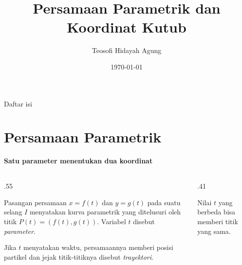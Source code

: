 \documentclass{../../kalkulus-ppt}
\author[Tetew]{Teosofi Hidayah Agung}
\date{\today}
\title[Kalkulus 2 - Bab 5]{Persamaan Parametrik dan Koordinat Kutub}
\institute[Matematika ITS]{Departemen Matematika\\ Institut Teknologi Sepuluh Nopember}
\newcommand{\sumbubidang}[4]{%
    \draw[sumbu] (#1,0) -- (#2,0) node[right,font=\scriptsize] {$x$};
    \draw[sumbu] (0,#3) -- (0,#4) node[above,font=\scriptsize] {$y$};
}
\begin{document}
\begin{frame}
    \titlepage
\end{frame}

\begin{frame}{Daftar isi}
    \tableofcontents
\end{frame}

\section{Persamaan Parametrik}

\begin{frame}{\insertsection}
    \framesubtitle{Satu parameter menentukan dua koordinat}
    \begin{columns}[c,onlytextwidth]
        \begin{column}{.55\textwidth}
            \begin{definisi}
                Pasangan persamaan $x=f(t)$ dan $y=g(t)$ pada
                suatu selang $I$ menyatakan kurva parametrik
                yang ditelusuri oleh titik $P(t)=(f(t),g(t))$.
                Variabel $t$ disebut \emph{parameter}.
            \end{definisi}
            Jika $t$ menyatakan waktu, persamaannya memberi posisi
            partikel dan jejak titik-titiknya disebut \emph{trayektori}.
        \end{column}
        \begin{column}{.41\textwidth}
            \centering
            \par
            \small Nilai $t$ yang berbeda bisa memberi titik yang sama.
        \end{column}
    \end{columns}
\end{frame}
\end{document}
